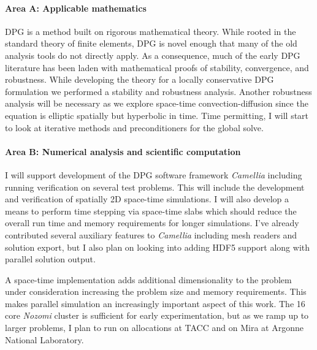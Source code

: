 \documentclass[letterpaper]{article}
\begin{document}


\paragraph{Area A: Applicable mathematics}
DPG is a method built on rigorous mathematical theory.
While rooted in the standard theory of finite elements, DPG is novel enough that many of the old analysis tools do not directly apply.
As a consequence, much of the early DPG literature has been laden with mathematical proofs of stability, convergence, and robustness.
While developing the theory for a locally conservative DPG formulation we performed a stability and robustness analysis.
Another robustness analysis will be necessary as we explore space-time convection-diffusion since the equation is elliptic spatially but hyperbolic in time.
Time permitting, I will start to look at iterative methods and preconditioners for the global solve.

\paragraph{Area B: Numerical analysis and scientific computation}
I will support development of the DPG software framework \emph{Camellia}\cite{Roberts2011} including running verification on several test problems.
This will include the development and verification of spatially 2D space-time simulations.
I will also develop a means to perform time stepping via space-time slabs which should reduce the 
overall run time and memory requirements for longer simulations.
I've already contributed several auxiliary features to \emph{Camellia} including mesh readers and solution export, 
but I also plan on looking into adding HDF5 support along with parallel solution output.

A space-time implementation adds additional dimensionality to the problem under consideration increasing the problem size and memory requirements.
This makes parallel simulation an increasingly important aspect of this work.
The 16 core \emph{Nozomi} cluster is sufficient for early experimentation, but as we ramp up to larger problems, I plan to run on allocations at TACC and on Mira at Argonne National Laboratory.
\end{document}
